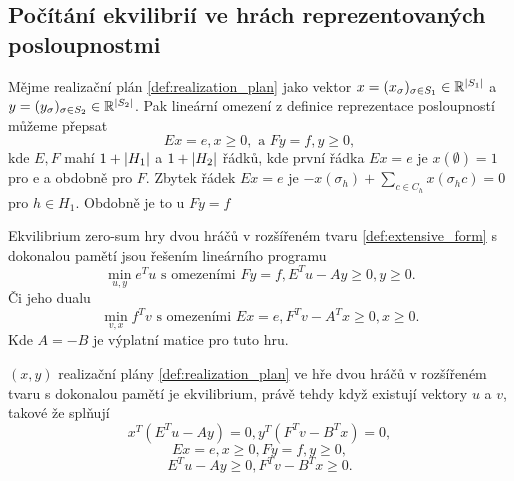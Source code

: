 \subsection{Počítání ekvilibrií ve hrách reprezentovaných posloupnostmi}
\begin{theorem}\label{thm:linear_solution}
    Mějme realizační plán \ref{def:realization_plan} jako vektor $x = (x_\sigma)_{\sigma \in S_1} \in \mathbb{R}^{\left|S_1\right|}$ a $y = (y_\sigma)_{\sigma \in S_2} \in \mathbb{R}^{\left|S_2\right|}$. 
    Pak lineární omezení z definice reprezentace posloupností můžeme přepsat 
    \[
        Ex = e, x\geq 0, \text{ a } Fy = f, y\geq 0,
    \]
    kde $E,F$ mahí $1 + \left|H_1\right|$ a $1 + \left|H_2\right|$ řádků, kde první řádka $Ex = e$ je $x(\emptyset) = 1$ pro e a obdobně pro $F$. 
    Zbytek řádek $Ex = e$ je $-x(\sigma_h) + \sum_{c \in C_h} x(\sigma_hc) = 0$ pro $h \in H_1$. 
    Obdobně je to u $Fy = f$

    Ekvilibrium zero-sum hry dvou hráčů v rozšířeném tvaru \ref{def:extensive_form} s dokonalou pamětí jsou řešením lineárního programu 
    \[
        \min_{u,y} e^T u \text{ s omezeními } Fy = f, E^Tu - Ay \geq 0, y \geq 0. 
    \]
    Či jeho dualu 
    \[
        \min_{v,x} f^T v \text{ s omezeními } Ex = e, F^Tv - A^Tx \geq 0, x \geq 0. 
    \]
    Kde $A = -B$ je výplatní matice pro tuto hru. 
\end{theorem}
\begin{theorem}\label{thm:linear_extended}
    $(x,y)$ realizační plány \ref{def:realization_plan} ve hře dvou hráčů v rozšířeném tvaru s dokonalou pamětí je ekvilibrium, právě tehdy když existují vektory $u$ a $v$, takové že splňují 
    \[
        x^T(E^Tu-Ay) = 0, y^T(F^Tv - B^Tx) = 0,
    \]
    \[
        Ex = e, x\geq 0, Fy = f, y \geq 0,
    \]
    \[
        E^Tu -Ay \geq 0, F^Tv -B^Tx \geq 0.
    \]
\end{theorem}
